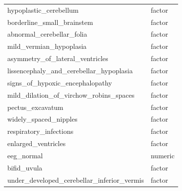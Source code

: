 \documentclass[
  authoryear,
  preprint,
  3p]{elsarticle}
\begin{document}
\begin{longtable}{ll}
hypoplastic\_cerebellum & factor \\ 
borderline\_small\_brainstem & factor \\ 
abnormal\_cerebellar\_folia & factor \\ 
mild\_vermian\_hypoplasia & factor \\ 
asymmetry\_of\_lateral\_ventricles & factor \\ 
lissencephaly\_and\_cerebellar\_hypoplasia & factor \\ 
signs\_of\_hypoxic\_encephalopathy & factor \\ 
mild\_dilation\_of\_virchow\_robins\_spaces & factor \\ 
pectus\_excavatum & factor \\ 
widely\_spaced\_nipples & factor \\ 
respiratory\_infections & factor \\ 
enlarged\_ventricles & factor \\ 
eeg\_normal & numeric \\ 
bifid\_uvula & factor \\ 
under\_developed\_cerebellar\_inferior\_vermis & factor \\ 
\bottomrule
\end{longtable}

\newpage


\renewcommand\refname{References}
  
\end{document}
